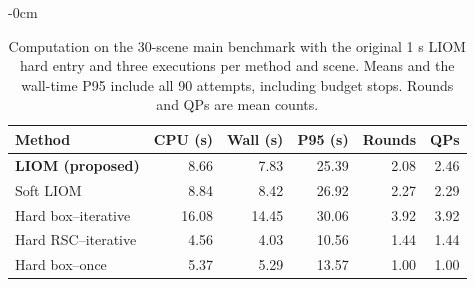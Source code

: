 \documentclass[electronics,article,submit,moreauthors]{Definitions/mdpi}
\providecommand{\DIFaddbegin}{}\providecommand{\DIFaddend}{} %
\providecommand{\DIFdelbegin}{}\providecommand{\DIFdelend}{} %
\begin{document}
\DIFdelend \DIFaddbegin \begin{table}[htbp]
\begin{adjustwidth}{-\extralength}{0cm}
\begin{mdframed}[linecolor=RevisionBlue,linewidth=.65pt,innerleftmargin=2pt,innerrightmargin=2pt,innertopmargin=3pt,innerbottommargin=3pt]
\color{RevisionBlue}
\setlength{\textwidth}{\linewidth}\setlength{\fulllength}{\linewidth}

\caption{Computation on the 30-scene main benchmark with the original 1 s LIOM hard entry and three executions per method and scene. Means and the wall-time P95 include all 90 attempts, including budget stops. Rounds and QPs are mean counts.\label{tab:main-new}}
\centering\small
\begin{tabular}{lrrrrr}\toprule
Method & CPU (s) & Wall (s) & P95 (s) & Rounds & QPs\\\midrule
\textbf{LIOM (proposed)} & 8.66 & 7.83 & 25.39 & 2.08 & 2.46\\
Soft LIOM & 8.84 & 8.42 & 26.92 & 2.27 & 2.29\\
Hard box--iterative & 16.08 & 14.45 & 30.06 & 3.92 & 3.92\\
Hard RSC--iterative & 4.56 & 4.03 & 10.56 & 1.44 & 1.44\\
Hard box--once & 5.37 & 5.29 & 13.57 & 1.00 & 1.00\\
\bottomrule\end{tabular}
\end{mdframed}
\end{adjustwidth}
\end{table}
\DIFaddend 





\DIFdelbegin 
\par{}\par
\end{document}

